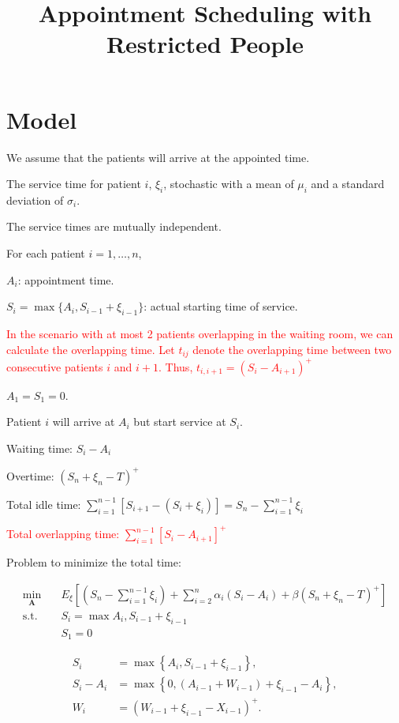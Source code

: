 \documentclass{article}
\title{Appointment Scheduling with Restricted People}
\date{}
\begin{document}
\maketitle

\section{Model}
We assume that the patients will arrive at the appointed time.

The service time for patient $i$, $\xi_{i}$, stochastic with a mean of $\mu_{i}$ and a standard deviation of $\sigma_{i}$.

The service times are mutually independent.

For each patient $i = 1, \ldots, n$, 

$A_{i}$: appointment time.

$S_{i} = \max\{A_{i}, S_{i-1} + \xi_{i-1}\}$: actual starting time of service.

\textcolor{red}{In the scenario with at most 2 patients overlapping in the waiting room, we can calculate the overlapping time.
Let $t_{ij}$ denote the overlapping time between two consecutive patients $i$ and $i+1$. Thus, $t_{i,i+1} = (S_{i} - A_{i+1})^{+}$}

$A_{1} = S_{1} = 0$.

Patient $i$ will arrive at $A_{i}$ but start service at $S_{i}$.

Waiting time: $S_{i} - A_{i}$

Overtime: $(S_{n} +\xi_{n} - T)^{+}$

Total idle time: $\sum_{i=1}^{n-1}[S_{i+1} - (S_{i} + \xi_{i})] = S_{n} - \sum_{i=1}^{n-1} \xi_{i}$

\textcolor{red}{Total overlapping time: $\sum_{i=1}^{n-1}[S_{i} - A_{i+1}]^{+}$}

Problem to minimize the total time:

\begin{equation}
    \begin{aligned}
        \min_{\mathbf{A}} \quad & E_{\xi}\left[\left(S_n-\sum_{i=1}^{n-1} \xi_i\right)+\sum_{i=2}^n \alpha_i \left(S_i-A_i\right) + \beta(S_{n} +\xi_{n} - T)^{+} \right] \\
        \mbox{s.t.} \quad & S_{i} = \max{A_{i}, S_{i-1} + \xi_{i-1}} \\
        & S_{1} = 0
    \end{aligned}
\end{equation}

\begin{align}
    S_i & =\max \left\{A_i, S_{i-1}+\xi_{i-1}\right\}, \\
    S_i-A_i & =\max \left\{0,\left(A_{i-1}+W_{i-1}\right)+\xi_{i-1}-A_i\right\}, \\
    W_i & =\left(W_{i-1}+\xi_{i-1}-X_{i-1}\right)^{+}.
\end{align}
\end{document}
